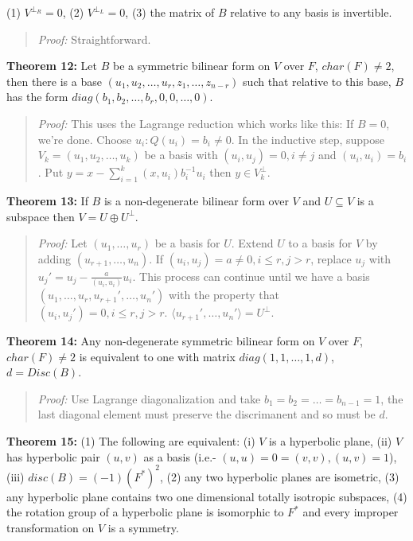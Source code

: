 (1) $V^{\perp_R}= 0$,
(2) $V^{\perp_L}= 0$,
(3) the matrix of $B$ relative to any basis is invertible.
\begin{quote}
\emph{Proof:} Straightforward.
\end{quote}
{\bf Theorem 12:} 
Let $B$ be a symmetric bilinear form on $V$ over $F$, $char(F) \ne 2$, then there
is a base $( u_1 , u_2 , \ldots , u_r , z_1 , \ldots ,  z_{n-r} )$  such that relative to
this base, $B$ has the form $diag( b_1 , b_2 , \ldots , b_r, 0, 0, \ldots ,0)$.
\begin{quote}
\emph{Proof:}  
This uses the Lagrange reduction which works like this:
If $B=0$, we're done.  Choose $u_i: Q(u_i ) = b_i \ne 0$.  In the inductive step,
suppose $V_k= (u_1 , u_2 , \ldots , u_k )$ be a basis with $(u_i, u_j) = 0, i \ne j$ and
$(u_i , u_i )= b_i$.  Put $y= x - \sum_{i=1}^k (x, u_i ) b_i^{-1} u_i$ then $y \in V_k^{\perp}$.
\end{quote}
{\bf Theorem 13:} If $B$ is a non-degenerate bilinear form over $V$ and $U \subseteq V$ is a 
subspace then $V= U \oplus U^{\perp}$.  
\begin{quote}
\emph{Proof:}  
Let $( u_1 , \ldots , u_r )$ be a basis for $U$.  Extend $U$ to a basis for $V$
by adding $(u_{r+1} , \ldots , u_n )$.
If $(u_i, u_j) = a \ne 0, i \le r, j>r$, replace
$u_j$ with $u_j'= u_j - {\frac {a} {(u_i, u_i)}} u_i$.  This process can continue until
we have a basis $(u_1 , \ldots , u_r, u_{r+1}', \ldots , u_n' )$ with the property that
$(u_i, u_j')=0, i \le r, j>r$.  $ \langle u_{r+1}', \ldots , u_n' \rangle = U^{\perp}$.
\end{quote}
{\bf Theorem 14:} 
Any non-degenerate symmetric bilinear form on $V$ over $F$, $char(F) \ne 2$ is equivalent to
one with matrix $diag(1,1,\ldots,1,d)$, $d= Disc(B)$.
\begin{quote}
\emph{Proof:}  
Use Lagrange diagonalization and take $b_1 = b_2 = \ldots =b_{n-1}=1$, the last diagonal element
must preserve the discrimanent and so must be $d$.
\end{quote}
{\bf Theorem 15:} 
(1) The following are equivalent:
(i) $V$ is a hyperbolic plane, 
(ii) $V$ has hyperbolic pair $(u,v)$ as a basis (i.e.- $(u,u)=0=(v,v), (u,v)=1$),
(iii) $disc(B)= (-1) (F^*)^2$,
(2) any two hyperbolic planes are isometric,
(3) any hyperbolic plane contains two one dimensional totally isotropic subspaces,
(4) the rotation group of a hyperbolic plane is isomorphic to $F^*$ and every improper
transformation on $V$ is a symmetry.
